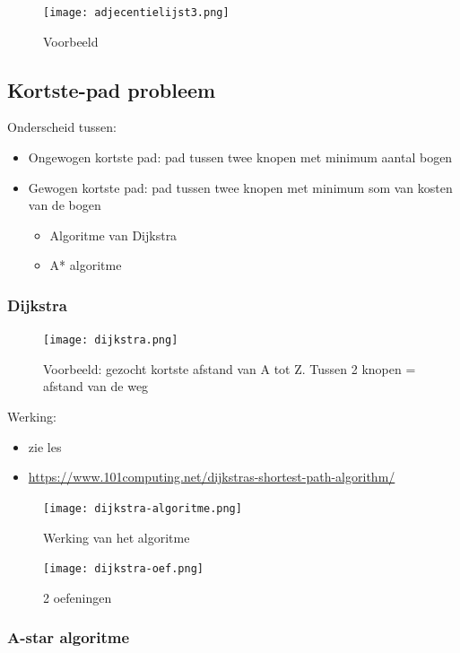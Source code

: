 \documentclass{article}
\begin{document}
\begin{figure}[H]
    \centering
    \texttt{[image: adjecentielijst3.png]}
    \caption{Voorbeeld}
\end{figure}

\subsection{Kortste-pad probleem}

Onderscheid tussen:

\begin{itemize}
    \item Ongewogen kortste pad: pad tussen twee knopen met minimum aantal bogen
    \item Gewogen kortste pad: pad tussen twee knopen met minimum som van kosten van de bogen
    \begin{itemize}
        \item Algoritme van Dijkstra
        \item A* algoritme
    \end{itemize}
\end{itemize}

\subsubsection{Dijkstra}

\begin{figure}[H]
    \centering
    \texttt{[image: dijkstra.png]}
    \caption{Voorbeeld: gezocht kortste afstand van A tot Z. Tussen 2 knopen = afstand van de weg}
\end{figure}

Werking: 

\begin{itemize}
    \item zie les
    \item \url{https://www.101computing.net/dijkstras-shortest-path-algorithm/}
\end{itemize}

\begin{figure}[H]
    \centering
    \texttt{[image: dijkstra-algoritme.png]}
    \caption{Werking van het algoritme}
\end{figure}

\begin{figure}[H]
    \centering
    \texttt{[image: dijkstra-oef.png]}
    \caption{2 oefeningen}
\end{figure}

\subsubsection{A-star algoritme}
\end{document}
